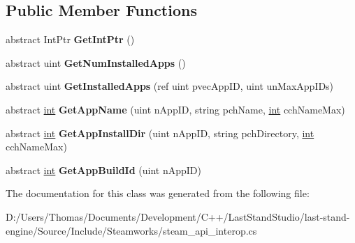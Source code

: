 \subsection*{Public Member Functions}
\begin{DoxyCompactItemize}
\item 
\hypertarget{classValve_1_1Steamworks_1_1ISteamAppList_ac4d5ce6bbbdf6b31a2d505c7a34d7c28}{}abstract Int\+Ptr {\bfseries Get\+Int\+Ptr} ()\label{classValve_1_1Steamworks_1_1ISteamAppList_ac4d5ce6bbbdf6b31a2d505c7a34d7c28}

\item 
\hypertarget{classValve_1_1Steamworks_1_1ISteamAppList_a02c7b5c4fafd1b3be749526e27d478ce}{}abstract uint {\bfseries Get\+Num\+Installed\+Apps} ()\label{classValve_1_1Steamworks_1_1ISteamAppList_a02c7b5c4fafd1b3be749526e27d478ce}

\item 
\hypertarget{classValve_1_1Steamworks_1_1ISteamAppList_aa8fb1b68e8edcf4d80df0b99da1febd9}{}abstract uint {\bfseries Get\+Installed\+Apps} (ref uint pvec\+App\+I\+D, uint un\+Max\+App\+I\+Ds)\label{classValve_1_1Steamworks_1_1ISteamAppList_aa8fb1b68e8edcf4d80df0b99da1febd9}

\item 
\hypertarget{classValve_1_1Steamworks_1_1ISteamAppList_a69fd2ab470946267f114c2b0320a6a0c}{}abstract \hyperlink{SDL__thread_8h_a6a64f9be4433e4de6e2f2f548cf3c08e}{int} {\bfseries Get\+App\+Name} (uint n\+App\+I\+D, string pch\+Name, \hyperlink{SDL__thread_8h_a6a64f9be4433e4de6e2f2f548cf3c08e}{int} cch\+Name\+Max)\label{classValve_1_1Steamworks_1_1ISteamAppList_a69fd2ab470946267f114c2b0320a6a0c}

\item 
\hypertarget{classValve_1_1Steamworks_1_1ISteamAppList_aff2b3d65e02e13e9f3992f4257633905}{}abstract \hyperlink{SDL__thread_8h_a6a64f9be4433e4de6e2f2f548cf3c08e}{int} {\bfseries Get\+App\+Install\+Dir} (uint n\+App\+I\+D, string pch\+Directory, \hyperlink{SDL__thread_8h_a6a64f9be4433e4de6e2f2f548cf3c08e}{int} cch\+Name\+Max)\label{classValve_1_1Steamworks_1_1ISteamAppList_aff2b3d65e02e13e9f3992f4257633905}

\item 
\hypertarget{classValve_1_1Steamworks_1_1ISteamAppList_a8acdec6f26c073ce511052ea515a215a}{}abstract \hyperlink{SDL__thread_8h_a6a64f9be4433e4de6e2f2f548cf3c08e}{int} {\bfseries Get\+App\+Build\+Id} (uint n\+App\+I\+D)\label{classValve_1_1Steamworks_1_1ISteamAppList_a8acdec6f26c073ce511052ea515a215a}

\end{DoxyCompactItemize}


The documentation for this class was generated from the following file\+:\begin{DoxyCompactItemize}
\item 
D\+:/\+Users/\+Thomas/\+Documents/\+Development/\+C++/\+Last\+Stand\+Studio/last-\/stand-\/engine/\+Source/\+Include/\+Steamworks/steam\+\_\+api\+\_\+interop.\+cs\end{DoxyCompactItemize}
